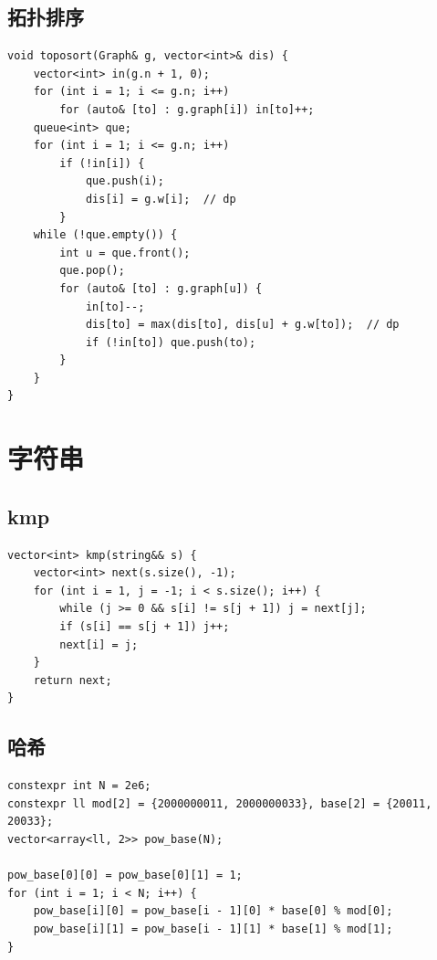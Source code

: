 \documentclass[UTF8]{ctexart}
\begin{document}
\begin{sloppypar}
\subsection{拓扑排序}

\begin{lstlisting}[style=cpp]
void toposort(Graph& g, vector<int>& dis) {
    vector<int> in(g.n + 1, 0);
    for (int i = 1; i <= g.n; i++)
        for (auto& [to] : g.graph[i]) in[to]++;
    queue<int> que;
    for (int i = 1; i <= g.n; i++)
        if (!in[i]) {
            que.push(i);
            dis[i] = g.w[i];  // dp
        }
    while (!que.empty()) {
        int u = que.front();
        que.pop();
        for (auto& [to] : g.graph[u]) {
            in[to]--;
            dis[to] = max(dis[to], dis[u] + g.w[to]);  // dp
            if (!in[to]) que.push(to);
        }
    }
}
\end{lstlisting}

\section{字符串}

\subsection{kmp}

\begin{lstlisting}[style=cpp]
vector<int> kmp(string&& s) {
    vector<int> next(s.size(), -1);
    for (int i = 1, j = -1; i < s.size(); i++) {
        while (j >= 0 && s[i] != s[j + 1]) j = next[j];
        if (s[i] == s[j + 1]) j++;
        next[i] = j;
    }
    return next;
}
\end{lstlisting}

\subsection{哈希}

\begin{lstlisting}[style=cpp]
constexpr int N = 2e6;
constexpr ll mod[2] = {2000000011, 2000000033}, base[2] = {20011, 20033};
vector<array<ll, 2>> pow_base(N);

pow_base[0][0] = pow_base[0][1] = 1;
for (int i = 1; i < N; i++) {
    pow_base[i][0] = pow_base[i - 1][0] * base[0] % mod[0];
    pow_base[i][1] = pow_base[i - 1][1] * base[1] % mod[1];
}


\end{lstlisting}
\end{sloppypar}
\end{document}
